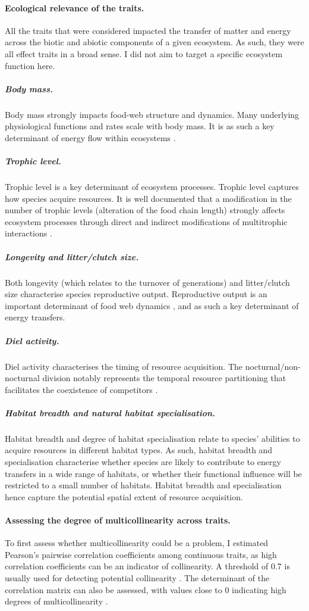\paragraph{Ecological relevance of the traits.} All the traits that were considered impacted the transfer of matter and energy across the biotic and abiotic components of a given ecosystem. As such, they were all effect traits in a broad sense. I did not aim to target a specific ecosystem function here.

\subparagraph{Body mass.} Body mass strongly impacts food-web structure and dynamics. Many underlying physiological functions and rates scale with body mass. It is as such a key determinant of energy flow within ecosystems \citep{Thompson2012,Malhi2016, Harfoot2014, Gillooly2001}.

\subparagraph{Trophic level.} Trophic level is a key determinant of ecosystem processes. Trophic level captures how species acquire resources. It is well documented that a modification in the number of trophic levels (alteration of the food chain length) strongly affects ecosystem processes through direct and indirect modifications of multitrophic interactions \citep{Duffy2007, Duffy2003, Thebault2003}. 
 
\subparagraph{Longevity and litter/clutch size.} Both longevity (which relates to the turnover of generations) and litter/clutch size characterise species reproductive output. Reproductive output is an important determinant of food web dynamics \citep{Chase1999, Hartvig2011}, and as such a key determinant of energy transfers.

\subparagraph{Diel activity.} Diel activity characterises the timing of resource acquisition. The nocturnal/non-nocturnal division notably represents the temporal resource partitioning that facilitates the coexistence of competitors \citep{Fox2011}. 

\subparagraph{Habitat breadth and natural habitat specialisation.} Habitat breadth and degree of habitat specialisation relate to species' abilities to acquire resources in different habitat types. As such, habitat breadth and specialisation characterise whether species are likely to contribute to energy transfers in a wide range of habitats, or whether their functional influence will be restricted to a small number of habitats. Habitat breadth and specialisation hence capture the potential spatial extent of resource acquisition.
 

\paragraph{Assessing the degree of multicollinearity across traits.}
To first assess whether multicollinearity could be a problem, I estimated Pearson's pairwise correlation coefficients among continuous traits, as high correlation coefficients can be an indicator of collinearity. A threshold of 0.7 is usually used for detecting potential collinearity \citep{Dormann2013}. The determinant of the correlation matrix can also be assessed, with values close to 0 indicating high degrees of multicollinearity \citep{Dormann2013}.

